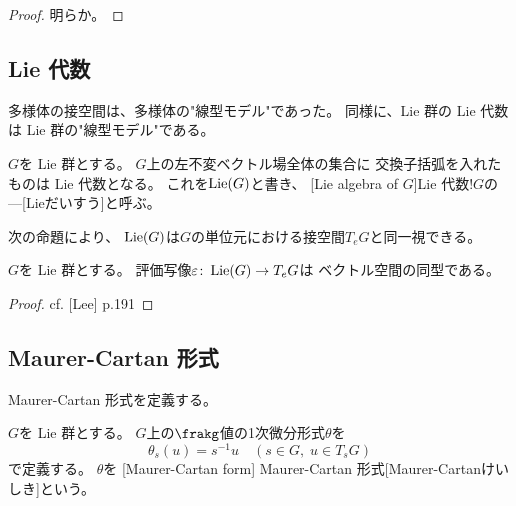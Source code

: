 \documentclass[report]{jlreq}
\begin{document}
\begin{proof}
    明らか。
\end{proof}


\subsection{Lie 代数}

多様体の接空間は、多様体の"線型モデル"であった。
同様に、Lie 群の Lie 代数は Lie 群の"線型モデル"である。



\begin{definition}
    $G$を Lie 群とする。
    $G$上の左不変ベクトル場全体の集合に
    交換子括弧を入れたものは Lie 代数となる。
    これを$\operatorname{Lie}(G)$と書き、
    [Lie algebra of $G$]{Lie 代数!$G$の---}[Lieだいすう]と呼ぶ。
\end{definition}

次の命題により、
$\operatorname{Lie}(G)$は$G$の単位元における接空間$T_e G$と同一視できる。

\begin{proposition}
    $G$を Lie 群とする。
    評価写像$\varepsilon \colon \operatorname{Lie}(G) \to T_eG$は
    ベクトル空間の同型である。
\end{proposition}

\begin{proof}
    cf. [Lee] p.191
\end{proof}

\begin{example}
    \TODO{}
\end{example}


\subsection{Maurer-Cartan 形式}


Maurer-Cartan 形式を定義する。

\begin{definition}
    $G$を Lie 群とする。
    $G$上の$\frakg$値の1次微分形式$\theta$を
    \begin{equation}
        \theta_s(u) = s^{-1}u
        \quad (s \in G,\; u \in T_sG)
    \end{equation}
    で定義する。
    $\theta$を
    [Maurer-Cartan form]
    {Maurer-Cartan 形式}[Maurer-Cartanけいしき]という。
\end{definition}
\end{document}
